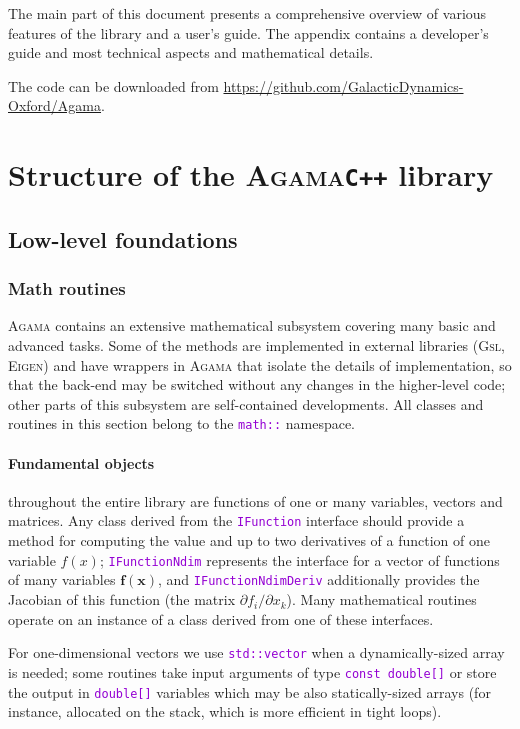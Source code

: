 \documentclass[12pt]{article}
\newcommand{\Agama}{\textsc{Agama}\xspace}
\newcommand{\Gsl}  {\textsc{Gsl}\xspace}
\newcommand{\Eigen}{\textsc{Eigen}\xspace}
\newcommand{\Cpp}  {\texttt{C++}\xspace}
\newcommand{\ttt}[1]{\textcolor{darkviolet}{\texttt{#1}}}
\renewcommand{\d}{\partial}
\newcommand{\bx}{\boldsymbol{x}}
\begin{document}
The main part of this document presents a comprehensive overview of various features of the library and a user's guide. The appendix contains a developer's guide and most technical aspects and mathematical details.

The code can be downloaded from \url{https://github.com/GalacticDynamics-Oxford/Agama}.


\section{Structure of the \Agama \Cpp library}  \label{sec:Structure}

\subsection{Low-level foundations}

\subsubsection{Math routines}  \label{sec:Math}
\Agama contains an extensive mathematical subsystem covering many basic and advanced tasks. Some of the methods are implemented in external libraries (\Gsl, \Eigen) and have wrappers in \Agama that isolate the details of implementation, so that the back-end may be switched without any changes in the higher-level code; other parts of this subsystem are self-contained developments.
All classes and routines in this section belong to the \ttt{math::} namespace.

\paragraph{Fundamental objects}
throughout the entire library are functions of one or many variables, vectors and matrices.
Any class derived from the \ttt{IFunction} interface should provide a method for computing the value and up to two derivatives of a function of one variable $f(x)$; \ttt{IFunctionNdim} represents the interface for a vector of functions of many variables $\boldsymbol{f}(\bx)$, and \ttt{IFunctionNdimDeriv} additionally provides the Jacobian of this function (the matrix $\d f_i /\d x_k$). Many mathematical routines operate on an instance of a class derived from one of these interfaces.

For one-dimensional vectors we use \ttt{std::vector} when a dynamically-sized array is needed; some routines take input arguments of type \ttt{const double[]} or store the output in \ttt{double[]} variables which may be also statically-sized arrays (for instance, allocated on the stack, which is more efficient in tight loops).
\end{document}
